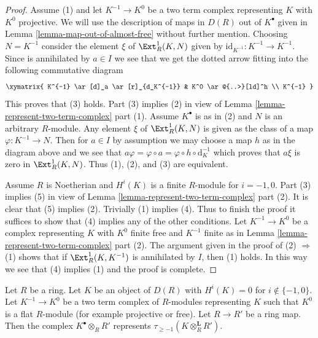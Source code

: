 \begin{proof}

\medskip\noindent
Assume (1) and let $K^{-1} \to K^0$
be a two term complex representing $K$
with $K^0$ projective.
We will use the description of maps in $D(R)$ out of $K^\bullet$ given in
Lemma \ref{lemma-map-out-of-almost-free} without further mention.
Choosing $N = K^{-1}$ consider the element $\xi$ of $\Ext^1_R(K, N)$
given by $\text{id}_{K^{-1}} : K^{-1} \to K^{-1}$. Since is annihilated
by $a \in I$ we see that we get the dotted arrow fitting into the
following commutative diagram
$$
\xymatrix{
K^{-1} \ar[d]_a \ar[r]_{d_K^{-1}} & K^0 \ar@{..>}[ld]^h \\
K^{-1}
}
$$
This proves that (3) holds. Part (3) implies (2) in view of
Lemma \ref{lemma-represent-two-term-complex} part (1). Assume
$K^\bullet$ is as in (2) and $N$ is an arbitrary $R$-module.
Any element $\xi$ of $\Ext^1_R(K, N)$ is given as the class of
a map $\varphi : K^{-1} \to N$. Then for $a \in I$ by assumption
we may choose a map $h$ as in the diagram above and we see that
$a\varphi = \varphi \circ a = \varphi \circ h \circ \text{d}_K^{-1}$
which proves that $a \xi$ is zero in $\Ext^1_R(K, N)$.
Thus (1), (2), and (3) are equivalent.

\medskip\noindent
Assume $R$ is Noetherian and $H^i(K)$ is a finite $R$-module for $i = -1, 0$.
Part (3) implies (5) in view of
Lemma \ref{lemma-represent-two-term-complex} part (2).
It is clear that (5) implies (2). Trivially (1) implies (4).
Thus to finish the proof it suffices to show that (4) implies
any of the other conditions. Let $K^{-1} \to K^0$ be a complex
representing $K$ with $K^0$ finite free and $K^{-1}$ finite as in
Lemma \ref{lemma-represent-two-term-complex} part (2). The argument
given in the proof of (2) $\Rightarrow$ (1)
shows that if $\Ext^1_R(K, K^{-1})$ is annihilated by $I$,
then (1) holds. In this way we see that (4) implies (1) and the
proof is complete.
\end{proof}

\begin{lemma}
\label{lemma-two-term-base-change}
Let $R$ be a ring. Let $K$ be an object of $D(R)$ with $H^i(K) = 0$
for $i \not \in \{-1, 0\}$. Let $K^{-1} \to K^0$ be a two term complex
of $R$-modules representing $K$ such that $K^0$ is a flat $R$-module
(for example projective or free). Let $R \to R'$ be a ring map.
Then the complex $K^\bullet \otimes_R R'$ represents
$\tau_{\geq -1}(K \otimes_R^\mathbf{L} R')$.
\end{lemma}

